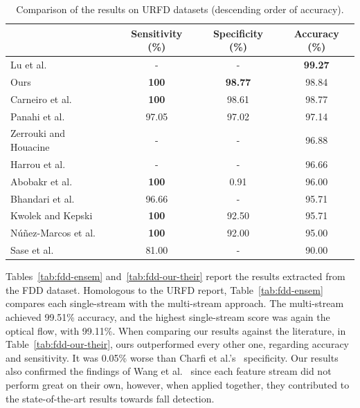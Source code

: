 \documentclass[conference]{IEEEtran}
\begin{document}
\begin{table}[!htb]
\renewcommand{\tabcolsep}{2.5mm}
\renewcommand{\arraystretch}{1.15}
\centering
\caption{Comparison of the results on URFD datasets (descending order of accuracy).}
\label{tab:urfd-our-their}
\begin{tabular}{lccc}
 \toprule
                                                      & Sensitivity (\%)  & Specificity (\%)  & Accuracy (\%)  \\
 \midrule
 Lu et al.~\cite{lu2019deep}                          & -                 & -                 & \textbf{99.27} \\
 Ours                                                 & \textbf{100}      & \textbf{98.77}    & 98.84          \\
 Carneiro et al.~\cite{Carneiro2019}                  & \textbf{100}      & 98.61             & 98.77          \\
 Panahi et al.~\cite{panahi2018human}                 & 97.05             & 97.02             & 97.14          \\
 Zerrouki and Houacine~\cite{zerrouki2018combined}    & -                 & -                 & 96.88          \\
 Harrou et al.~\cite{harrou2017vision}                & -                 & -                 & 96.66          \\
 Abobakr et al.~\cite{abobakr2017skeleton}            & \textbf{100}      & 0.91              & 96.00          \\
 Bhandari et al.~\cite{bhandari2017novel}             & 96.66             & -                 & 95.71          \\
 Kwolek and Kepski~\cite{kwolek2015improving}         & \textbf{100}      & 92.50             & 95.71          \\
 N\'u\~nez-Marcos et al.~\cite{nunez2017vision}       & \textbf{100}      & 92.00             & 95.00          \\
 Sase et al.~\cite{sase2018human}                     & 81.00             & -                 & 90.00          \\
 \bottomrule
\end{tabular}
\end{table}

Tables~\ref{tab:fdd-ensem} and~\ref{tab:fdd-our-their} report the results extracted from the FDD dataset. Homologous to the URFD report, Table~\ref{tab:fdd-ensem} compares each single-stream with the multi-stream approach. The multi-stream achieved 99.51\% accuracy, and the highest single-stream score was again the optical flow, with 99.11\%. When comparing our results against the literature, in Table~\ref{tab:fdd-our-their}, ours outperformed every other one, regarding accuracy and sensitivity. It was 0.05\% worse than Charfi et al.'s~\cite{charfi2013optimised} specificity. Our results also confirmed the findings of Wang et al.~\cite{wang2015towards} since each feature stream did not perform great on their own, however, when applied together, they contributed to the state-of-the-art results towards fall detection.
\end{document}

